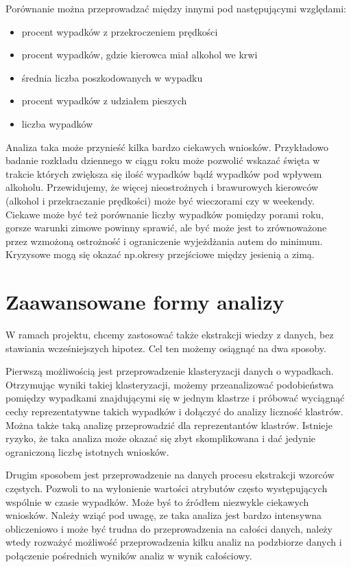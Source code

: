 Porównanie można przeprowadzać między innymi pod następującymi
względami:

\begin{itemize}
\itemsep1pt\parskip0pt
\item
  procent wypadków z przekroczeniem prędkości\\
\item
  procent wypadków, gdzie kierowca miał alkohol we krwi\\
\item
  średnia liczba poszkodowanych w wypadku\\
\item
  procent wypadków z udziałem pieszych\\
\item
  liczba wypadków
\end{itemize}

Analiza taka może przynieść kilka bardzo ciekawych wniosków. Przykładowo
badanie rozkładu dziennego w ciągu roku może pozwolić wskazać święta w
trakcie których zwiększa się ilość wypadków bądź wypadków pod wpływem
alkoholu. Przewidujemy, że więcej nieostrożnych i brawurowych kierowców
(alkohol i przekraczanie prędkości) może być wieczorami czy w weekendy.
Ciekawe może być też porównanie liczby wypadków pomiędzy porami roku,
gorsze warunki zimowe powinny sprawić, ale być może jest to zrównoważone
przez wzmożoną ostrożność i ograniczenie wyjeżdżania autem do minimum.
Kryzysowe mogą się okazać np.okresy przejściowe między jesienią a zimą.

\section{Zaawansowane formy
analizy}\label{zaawansowane-formy-analizy}

W ramach projektu, chcemy zastosować także ekstrakcji wiedzy z danych,
bez stawiania wcześniejszych hipotez. Cel ten możemy osiągnąć na dwa
sposoby.

Pierwszą możliwością jest przeprowadzenie klasteryzacji danych o
wypadkach. Otrzymując wyniki takiej klasteryzacji, możemy przeanalizować
podobieństwa pomiędzy wypadkami znajdującymi się w jednym klastrze i
próbować wyciągnąć cechy reprezentatywne takich wypadków i dołączyć do
analizy liczność klastrów. Można także taką analizę przeprowadzić dla
reprezentantów klastrów. Istnieje ryzyko, że taka analiza może okazać
się zbyt skomplikowana i dać jedynie ograniczoną liczbę istotnych
wniosków.

Drugim sposobem jest przeprowadzenie na danych procesu ekstrakcji
wzorców częstych. Pozwoli to na wyłonienie wartości atrybutów często
występujących wspólnie w czasie wypadków. Może byś to źródłem niezwykle
ciekawych wniosków. Należy wziąć pod uwagę, ze taka analiza jest bardzo
intensywna obliczeniowo i może być trudna do przeprowadzenia na całości
danych, należy wtedy rozważyć możliwość przeprowadzenia kilku analiz na
podzbiorze danych i połączenie pośrednich wyników analiz w wynik
całościowy.
